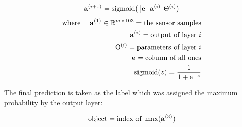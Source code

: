 $$ \mathbf{a}^{(i+1)} = \operatorname{sigmoid}\bigl(\bigl[\mathbf{e}~~\mathbf{a}^{(i)}\bigr] \Theta^{(i)}\bigr) $$
\begin{eqnarray*}
 \text{where } &&\mathbf{a}^{(1)} \in \mathbb{R}^{m\,\mathrm{x}\,103} = \text{the sensor samples} \\
 				&&\mathbf{a}^{(i)} = \text{output of layer } i \\
 				&&\Theta^{(i)} = \text{parameters of layer } i \\
				&&\mathbf{e} = \text{column of all ones} \\
				&&\operatorname{sigmoid}(z) = \frac{1}{1 + \mathrm{e}^{-z}}
\end{eqnarray*}

The final prediction is taken as the label which was assigned the maximum probability by the output layer:

$$ \operatorname{object} = \text{index of } \max(\mathbf{a}^{(3)}) $$
